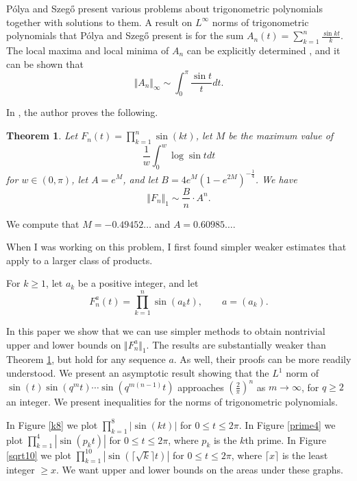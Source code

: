 \documentclass{amsart}
\newcommand{\norm}[1]{\Vert #1 \Vert}
\newtheorem{theorem}{Theorem}
\begin{document}
P\'olya and Szeg{\H o} \cite[Part VI]{polya} present various problems about trigonometric polynomials together  with solutions to them.
A result on $L^\infty$ norms of trigonometric polynomials that P\'olya and Szeg{\H o} present is for the sum $A_n(t)=\sum_{k=1}^n \frac{\sin kt}{k}$. The local maxima and local minima of $A_n$ can be
explicitly determined \cite[p.~74, no.~23]{polya}, and 
it can be shown that \cite[p.~74, no.~25]{polya}
\[
\norm{A_n}_\infty \sim
\int_0^\pi \frac{\sin t}{t} dt.
\]

In \cite[p.~532, Theorem 2]{MR3061031}, the author proves the following.

\begin{theorem}
Let $F_n(t)=\prod_{k=1}^n \sin(kt)$, let $M$ be the maximum value of
\[
\frac{1}{w} \int_0^w \log \sin t dt
\]
for $w \in (0,\pi)$, let $A=e^M$, and let $B=4e^M\left(1-e^{2M} \right)^{-\frac{1}{4}}$. 
We have
\[
\norm{F_n}_1 \sim \frac{B}{n} \cdot A^n.
\]
\label{bell}
\end{theorem}

We compute that $M=-0.49452\ldots$ and $A=0.60985\ldots$.

When I was working on this problem, I first found simpler weaker estimates that apply to a larger class of products.

For $k \geq 1$, let $a_k$ be a positive integer, and let 
\[
F^a_n(t)=\prod_{k=1}^n \sin (a_k t), \qquad a=(a_k).
\]



In this paper we show that we can use simpler methods to obtain nontrivial upper and lower bounds on $\norm{F_n^a}_1$.
The results are substantially weaker than Theorem \ref{bell}, but hold for any sequence $a$. As well, their proofs can be more readily understood. 
We  present an asymptotic result showing that the $L^1$ norm of $\sin(t)\sin(q^m t)\cdots \sin(q^{m(n-1)}t)$ approaches
$\left( \frac{2}{\pi} \right)^n$ as $m \to \infty$, for $q \geq 2$ an integer. We present inequalities
for the norms of trigonometric polynomials.

In Figure \ref{k8} we plot $\prod_{k=1}^8 |\sin(kt)|$ for $0 \leq t \leq 2\pi$. In Figure \ref{prime4} we plot $\prod_{k=1}^4 |\sin(p_k t)|$ for $0 \leq t \leq 2\pi$, where $p_k$ is the $k$th prime. In Figure \ref{sqrt10} we plot $\prod_{k=1}^{10} |\sin(\lceil \sqrt{k} \rceil t)|$ for $0 \leq t \leq 2\pi$, where $\lceil x \rceil$ is the least integer $\geq x$. 
We want upper and lower bounds on the areas under these graphs.
\end{document}
